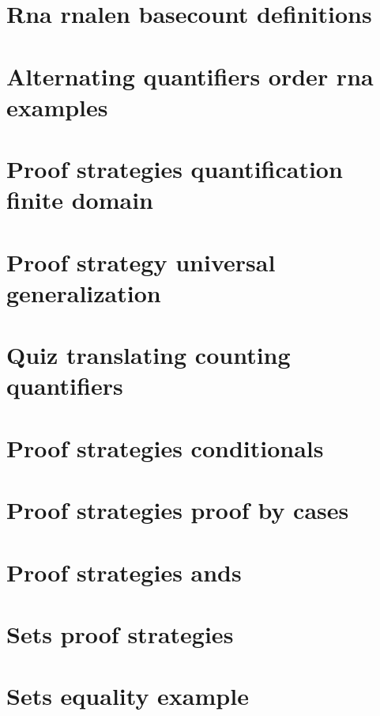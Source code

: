 \section*{Rna rnalen basecount definitions}

\vfill
\section*{Alternating quantifiers order rna examples}

\vfill
\section*{Proof strategies quantification finite domain}

\vfill
\section*{Proof strategy universal generalization}

\vfill
\section*{Quiz translating counting quantifiers}

\vfill
\section*{Proof strategies conditionals}

\vfill
\section*{Proof strategies proof by cases}

\vfill
\section*{Proof strategies ands}

\vfill
\section*{Sets proof strategies}

\vfill
\section*{Sets equality example}

\vfill
